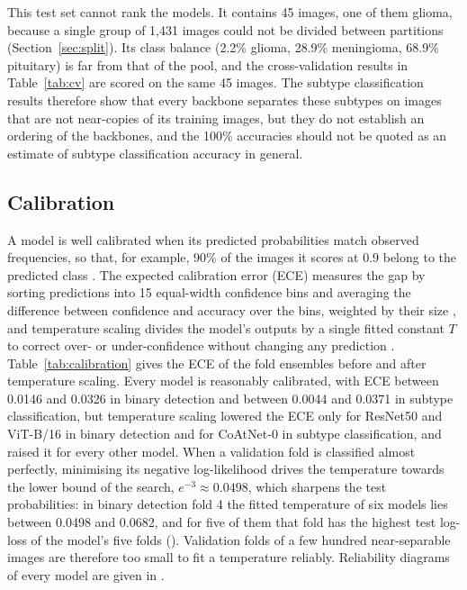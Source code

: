 \documentclass[a4paper,fleqn]{cas-sc}
\begin{document}
This test set cannot rank the models. It contains 45 images, one of them glioma, because a single group of 1,431 images could not be divided between partitions (Section~\ref{sec:split}). Its class balance (2.2\% glioma, 28.9\% meningioma, 68.9\% pituitary) is far from that of the pool, and the cross-validation results in Table~\ref{tab:cv} are scored on the same 45 images. The subtype classification results therefore show that every backbone separates these subtypes on images that are not near-copies of its training images, but they do not establish an ordering of the backbones, and the 100\% accuracies should not be quoted as an estimate of subtype classification accuracy in general.

\subsection{Calibration}
\label{sec:calibration}

A model is well calibrated when its predicted probabilities match observed frequencies, so that, for example, 90\% of the images it scores at 0.9 belong to the predicted class \citep{guo2017}. The expected calibration error (ECE) measures the gap by sorting predictions into 15 equal-width confidence bins and averaging the difference between confidence and accuracy over the bins, weighted by their size \citep{naeini2015}, and temperature scaling divides the model's outputs by a single fitted constant $T$ to correct over- or under-confidence without changing any prediction \citep{guo2017}. Table~\ref{tab:calibration} gives the ECE of the fold ensembles before and after temperature scaling. Every model is reasonably calibrated, with ECE between 0.0146 and 0.0326 in binary detection and between 0.0044 and 0.0371 in subtype classification, but temperature scaling lowered the ECE only for ResNet50 and ViT-B/16 in binary detection and for CoAtNet-0 in subtype classification, and raised it for every other model. When a validation fold is classified almost perfectly, minimising its negative log-likelihood drives the temperature towards the lower bound of the search, $e^{-3}\approx 0.0498$, which sharpens the test probabilities: in binary detection fold 4 the fitted temperature of six models lies between 0.0498 and 0.0682, and for five of them that fold has the highest test log-loss of the model's five folds (). Validation folds of a few hundred near-separable images are therefore too small to fit a temperature reliably. Reliability diagrams of every model are given in .
\end{document}
